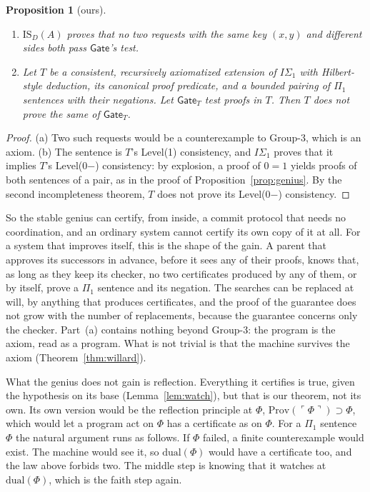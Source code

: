 \documentclass[11pt]{article}
\newcommand{\Prog}[1]{\mathsf{#1}}
\newcommand{\fs}[1]{\ifmmode\text{\guillemotleft#1\guillemotright}\else\guillemotleft#1\guillemotright\fi}
\newcommand{\Prov}{\mathrm{Prov}}
\newcommand{\gn}[1]{\ulcorner #1\urcorner}  %
\newcommand{\ISD}{\mathrm{IS}_D(A)}
\theoremstyle{plain}
\newtheorem{proposition}[theorem]{Proposition}
\theoremstyle{definition}
\begin{document}
\begin{proposition}[ours]\label{prop:gate}
\leavevmode
\begin{enumerate}[label=(\alph*)]
\item $\ISD$ proves that no two requests with the same key $(x, y)$ and
  different sides both pass $\Prog{Gate}$'s test.
\item Let $T$ be a consistent, recursively axiomatized extension of
  $I\Sigma_1$ with Hilbert-style deduction, its canonical proof predicate,
  and a bounded pairing of $\Pi_1$ sentences with their negations. Let
  $\Prog{Gate}_T$ test proofs in $T$. Then $T$ does not prove the same of
  $\Prog{Gate}_T$.
\end{enumerate}
\end{proposition}

\begin{proof}
(a) Two such requests would be a counterexample to Group-3, which is an
axiom. (b) The sentence is $T$'s Level(1) consistency, and $I\Sigma_1$
proves that it implies $T$'s Level(0$-$) consistency: by explosion, a proof
of $0 = 1$ yields proofs of both sentences of a pair, as in the proof of
Proposition~\ref{prop:genius}. By the second incompleteness theorem, $T$ does
not prove its Level(0$-$) consistency.
\end{proof}

So the stable genius can certify, from inside, a commit protocol that needs
no coordination, and an ordinary system cannot certify its own copy of it at
all. For a system that improves itself, this is the shape of the gain. A
parent that approves its successors in advance, before it sees any of their
proofs, knows that, as long as they keep its checker, no two certificates
produced by any of them, or by itself, prove a $\Pi_1$ sentence and its
negation. The searches can be replaced at will, by anything that produces
certificates, and the proof of the guarantee does not grow with the number
of replacements, because the guarantee concerns only the checker. Part~(a)
contains nothing beyond Group-3: the program is the axiom, read as a
program. What is not trivial is that the machine survives the axiom
(Theorem~\ref{thm:willard}).

What the genius does not gain is reflection. Everything it certifies is
true, given the hypothesis on its base (Lemma~\ref{lem:watch}), but that is
our theorem, not its own. Its own version would be the reflection principle
at $\Phi$, $\Prov(\gn{\Phi}) \supset \Phi$, which would let a program act on
\fs{$\Phi$ has a certificate} as on $\Phi$. For a $\Pi_1$ sentence $\Phi$ the
natural
argument runs as follows. If $\Phi$ failed, a finite counterexample would
exist. The machine would see it, so $\mathrm{dual}(\Phi)$ would have a
certificate too, and the law above forbids two. The middle step is knowing
that it watches at $\mathrm{dual}(\Phi)$, which is the faith step again.
\end{document}
